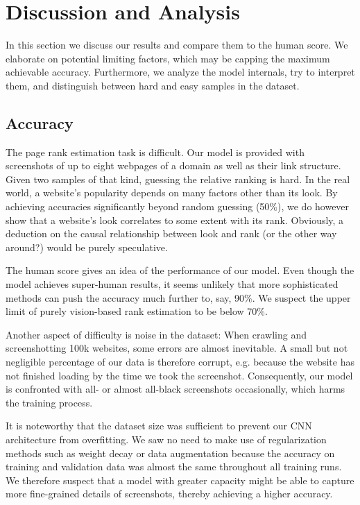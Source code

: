 \section{Discussion and Analysis}

In this section we discuss our results and compare them to the human score. We elaborate on potential limiting factors, which may be capping the maximum achievable accuracy. Furthermore, we analyze the model internals, try to interpret them, and distinguish between hard and easy samples in the dataset.

\subsection{Accuracy}

The page rank estimation task is difficult. Our model is provided with screenshots of up to eight webpages of a domain as well as their link structure. Given two samples of that kind, guessing the relative ranking is hard. In the real world, a website's popularity depends on many factors other than its look. By achieving accuracies significantly beyond random guessing (50\%), we do however show that a website's look correlates to some extent with its rank. Obviously, a deduction on the causal relationship between look and rank (or the other way around?) would be purely speculative.

The human score gives an idea of the performance of our model. Even though the model achieves super-human results, it seems unlikely that more sophisticated methods can push the accuracy much further to, say, 90\%. We suspect the upper limit of purely vision-based rank estimation to be below 70\%.

Another aspect of difficulty is noise in the dataset: When crawling and screenshotting 100k websites, some errors are almost inevitable. A small but not negligible percentage of our data is therefore corrupt, e.g. because the website has not finished loading by the time we took the screenshot. Consequently, our model is confronted with all- or almost all-black screenshots occasionally, which harms the training process.

It is noteworthy that the dataset size was sufficient to prevent our CNN architecture from overfitting. We saw no need to make use of regularization methods such as weight decay or data augmentation because the accuracy on training and validation data was almost the same throughout all training runs. We therefore suspect that a model with greater capacity might be able to capture more fine-grained details of screenshots, thereby achieving a higher accuracy.

